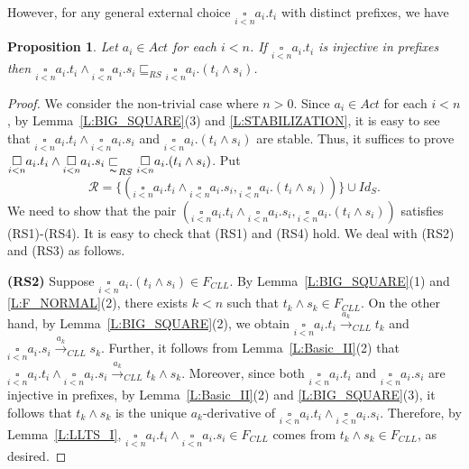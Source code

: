 \documentclass{elsarticle}
\theoremstyle{plain}
\newtheorem{proposition}[theorem]{Proposition}
\theoremstyle{definition}
\begin{document}
However, for any general external choice $\underset{i<n}\square a_i.t_i$ with distinct prefixes, we have

\begin{proposition}\label{L:MULTIPLE_II}
Let $a_i \in Act$ for each $i<n$.
  If $\underset{i< n}{\square}a_i.t_i$ is injective in prefixes then $\underset{i< n}{\square}a_i.t_i\wedge \underset{i< n}{\square}a_i.s_i \sqsubseteq_{RS} \underset{i< n} {\square}a_i.(t_i \wedge s_i)$.
\end{proposition}
\begin{proof}
We consider the non-trivial case where $n>0$.
Since $a_i \in Act$ for each $i< n$, by Lemma~\ref{L:BIG_SQUARE}(3) and \ref{L:STABILIZATION}, it is easy to see that $\underset{i< n}{\square}a_i.t_i \wedge \underset{i < n}{\square}a_i.s_i$ and $\underset{i< n}{\square}a_i.(t_i \wedge s_i)$ are stable.
Thus, it suffices to prove $ \underset{i< n}{\square}a_i.t_i \wedge \underset{i< n}{\square}a_i.s_i \underset{\thicksim}{\sqsubset}_{RS} \underset{i< n} {\square}a_i.(t_i \wedge s_i)$. Put
\[ {\mathcal R}=\{ (\underset{i< n}{\square}a_i.t_i \wedge \underset{i< n}{\square}a_i.s_i , \underset{i< n} {\square}a_i.(t_i \wedge s_i)) \} \cup Id_S.\]
We need to show that the pair $(\underset{i< n}{\square}a_i.t_i \wedge \underset{i< n}{\square}a_i.s_i , \underset{i< n} {\square}a_i.(t_i \wedge s_i))$ satisfies (RS1)-(RS4).
It is easy to check that (RS1) and (RS4) hold. We deal with (RS2) and (RS3) as follows.

\textbf{(RS2)} Suppose $\underset{i< n} {\square}a_i.(t_i \wedge s_i) \in F_{CLL}$.
By Lemma~\ref{L:BIG_SQUARE}(1) and \ref{L:F_NORMAL}(2), there exists $k<n$ such that $t_k \wedge s_k \in F_{CLL}$.
On the other hand, by Lemma~\ref{L:BIG_SQUARE}(2), we obtain $ \underset{i< n}{\square}a_i.t_i \stackrel{a_k}{\longrightarrow}_{CLL} t_k$ and $ \underset{i< n}{\square}a_i.s_i \stackrel{a_k}{\longrightarrow}_{CLL} s_k$.
Further, it follows from Lemma~\ref{L:Basic_II}(2) that $\underset{i< n}{\square}a_i.t_i \wedge \underset{i< n}{\square}a_i.s_i \stackrel{a_k}{\longrightarrow}_{CLL} t_k \wedge s_k$.
Moreover, since both $\underset{i<n}{\square}a_i.t_i$ and $\underset{i<n}{\square}a_i.s_i$ are injective in prefixes, by Lemma~\ref{L:Basic_II}(2) and \ref{L:BIG_SQUARE}(3), it follows that $t_k \wedge s_k$ is the unique $a_k$-derivative of $ \underset{i< n}{\square}a_i.t_i\wedge \underset{i< n}{\square}a_i.s_i$. Therefore, by Lemma~\ref{L:LLTS_I}, $ \underset{i< n}{\square}a_i.t_i\wedge \underset{i< n}{\square}a_i.s_i \in F_{CLL}$ comes from $t_k \wedge s_k \in F_{CLL}$, as desired.


\end{proof}
\end{document}
